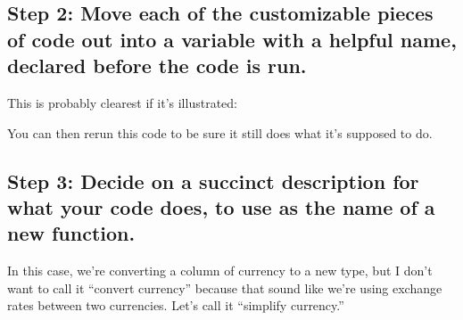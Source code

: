 \documentclass[letterpaper,10pt,english]{sphinxmanual}
\begin{document}
\subsection{Step 2:  Move each of the customizable pieces of code out into a variable with a helpful name, declared before the code is run.}
\label{\detokenize{chapter-7-abstraction:step-2-move-each-of-the-customizable-pieces-of-code-out-into-a-variable-with-a-helpful-name-declared-before-the-code-is-run}}
This is probably clearest if it’s illustrated:

\begin{sphinxVerbatim}[commandchars=\\\{\}]
  
  
\PYG{p}{[}\PYG{p}{]}  \PYG{p}{[}\PYG{p}{]}    
\PYG{p}{[}\PYG{p}{]}  \PYG{p}{[}\PYG{p}{]}    
\PYG{p}{[}\PYG{p}{]}  \PYG{p}{[}\PYG{p}{]}           
\end{sphinxVerbatim}

You can then re\sphinxhyphen{}run this code to be sure it still does what it’s supposed to do.


\subsection{Step 3:  Decide on a succinct description for what your code does, to use as the name of a new function.}
\label{\detokenize{chapter-7-abstraction:step-3-decide-on-a-succinct-description-for-what-your-code-does-to-use-as-the-name-of-a-new-function}}
In this case, we’re converting a column of currency to a new type, but I don’t want to call it “convert currency” because that sound like we’re using exchange rates between two currencies.  Let’s call it “simplify currency.”
\end{document}
